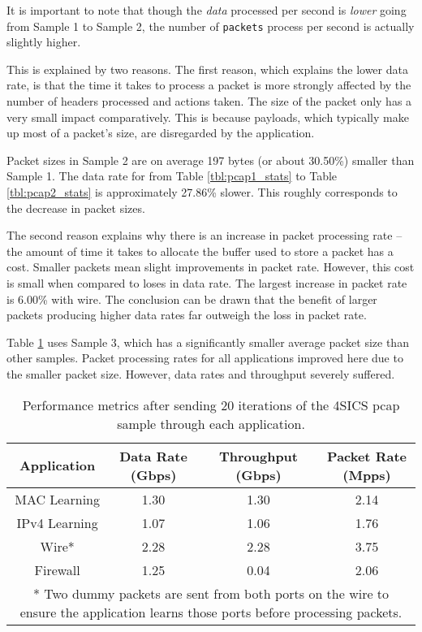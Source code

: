 It is important to note that though the \emph{data} processed per second is \emph{lower} going from Sample 1 to Sample 2, the number of \texttt{packets} process per second is actually slightly higher.

This is explained by two reasons. The first reason, which explains the lower data rate, is that the time it takes to process a packet is more strongly affected by the number of headers processed and actions taken. The size of the packet only has a very small impact comparatively.
This is because payloads, which typically make up most of a packet's size, are disregarded by the application.

Packet sizes in Sample 2 are on average 197 bytes (or about 30.50\%) smaller than Sample 1. The data rate for from Table \ref{tbl:pcap1_stats} to Table \ref{tbl:pcap2_stats} is approximately 27.86\% slower. This roughly corresponds to the decrease in packet sizes.

The second reason explains why there is an increase in packet processing rate -- the amount of time it takes to allocate the buffer used to store a packet has a cost.
Smaller packets mean slight improvements in packet rate. However, this cost is small when compared to loses in data rate.
The largest increase in packet rate is 6.00\% with wire. The conclusion can be drawn that the benefit of larger packets producing higher data rates far outweigh the loss in packet rate.

Table \ref{tbl:pcap3_stats} uses Sample 3, which has a significantly smaller average packet size than other samples. 
Packet processing rates for all applications improved here due to the smaller packet size. However, data rates and throughput severely suffered.

\begin{table}[ht]
\caption{Performance metrics after sending 20 iterations of the 4SICS pcap sample through each application.}
\begin{center}
\begin{tabularx}{\linewidth}{| c || c | c | c | }
\hline
Application & Data Rate (Gbps) & Throughput (Gbps) & Packet Rate (Mpps) \\
\hline
MAC Learning & 1.30 & 1.30 & 2.14  \\
\hline
IPv4 Learning & 1.07 & 1.06 & 1.76  \\
\hline 
Wire* & 2.28 & 2.28 & 3.75 \\
\hline
Firewall & 1.25 & 0.04 & 2.06 \\
\hline
\multicolumn{4}{p{\linewidth}}{* Two dummy packets are sent from both ports on the wire to ensure the application learns those ports before processing packets.}
\end{tabularx}
\end{center}
\label{tbl:pcap3_stats}
\end{table}

